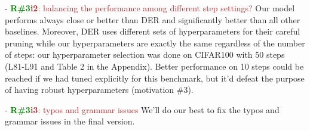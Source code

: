 \documentclass[rebuttal]{cvpr}
\newcommand{\rthree}{\textcolor{green}{\textbf{R\#3}}\xspace}
\begin{document}
- \rthree \textcolor{brown}{\textbf{i2}: balancing the performance among different step settings?} Our model performs always close or better than DER and significantly better than all other baselines. Moreover, DER uses different sets of hyperparameters for their careful pruning while our hyperparameters are exactly the same regardless of the number of steps: our hyperparameter selection was done on CIFAR100 with 50 steps (L81-L91 and Table 2 in the Appendix). Better performance on 10 steps could be reached if we had tuned explicitly for this benchmark, but it'd defeat the purpose of having robust hyperparameters (motivation \#3). 

- \rthree \textcolor{brown}{\textbf{i3}: typos and grammar issues} We'll do our best to fix the typos and grammar issues in the final version.
\end{document}
